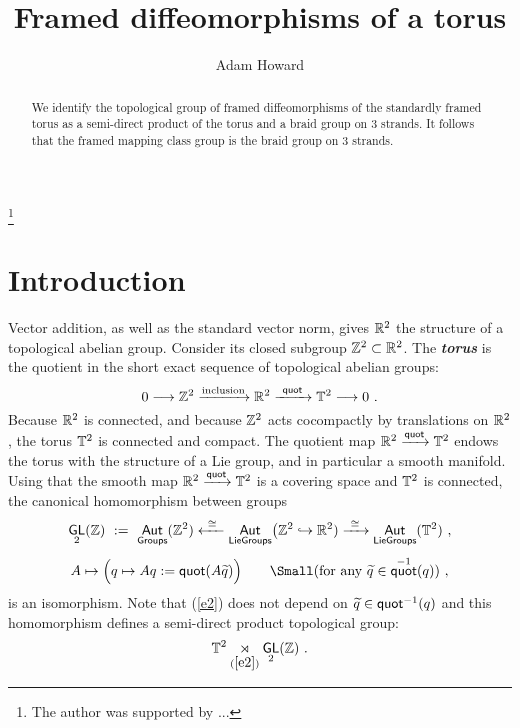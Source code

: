 \documentclass{amsart}
\theoremstyle{definition}
\theoremstyle{remark}
\DeclareMathOperator{\Aut}{\sf Aut}
\newcommand{\w}{\widetilde}
\newcommand{\xra}{\xrightarrow}
\newcommand{\xla}{\xleftarrow}
\DeclareMathOperator{\GL}{\sf GL}
\DeclareMathOperator{\quot}{\sf quot}
\begin{document}
\title{Framed diffeomorphisms of a torus}


\author{Adam Howard}




\address{Department of Mathematics\\Montana State University\\Bozeman, MT 59717}
\thanks{The author was supported by ...}






\begin{abstract}
We identify the topological group of framed diffeomorphisms of the standardly framed torus as a semi-direct product of the torus and a braid group on 3 strands.  
It follows that the framed mapping class group is the braid group on 3 strands.  
\end{abstract}





\maketitle


\tableofcontents


\section*{Introduction}

Vector addition, as well as the standard vector norm, gives $\mathbb R^2$ the structure of a topological abelian group.
Consider its closed subgroup $\mathbb Z^2\subset \mathbb R^2$.  
The \textit{\textbf{torus}} is the quotient in the short exact sequence of topological abelian groups:
\[
0
\longrightarrow
\ZZ^2
\xra{\rm inclusion}
\RR^2 
\xra{~\quot~}
\TT^2
\longrightarrow
0
~.
\] 
Because $\mathbb R^2$ is connected, and because $\mathbb Z^2$ acts cocompactly by translations on $\mathbb R^2$, the torus $\mathbb T^2$ is connected and compact.  
The quotient map $\RR^2 \xra{\quot} \TT^2$ endows the torus with the structure of a Lie group, and in particular a smooth manifold.
Using that the smooth map $\RR^2 \xra{\quot} \TT^2$ is a covering space and $\mathbb T^2$ is connected, the canonical homomorphism between groups
\begin{equation}
\label{e2}
\GL_2(\ZZ)
~:=~
\Aut_{\sf Groups}(\ZZ^2)
\xla{~\cong~}
\Aut_{\sf LieGroups}\bigl( \ZZ^2 \hookrightarrow \RR^2)
\xra{~\cong~}
\Aut_{\sf LieGroups}(\TT^2)
~,
\end{equation}
\[
A
\mapsto 
\Bigl(
q
\mapsto 
Aq
:=
\quot( A\w{q} )
\Bigr)
\qquad
{\Small (\text{for any }\w{q} \in \quot^{-1}(q)) }
~,
\]
is an isomorphism. Note that (\ref{e2}) does not depend on $\w{q} \in \quot^{-1}(q)$ and this homomorphism defines a semi-direct product topological group:
\begin{equation}
\label{e6}
\TT^2 \underset{(\ref{e2})}\rtimes \GL_2(\ZZ)
~.
\end{equation}
\end{document}
